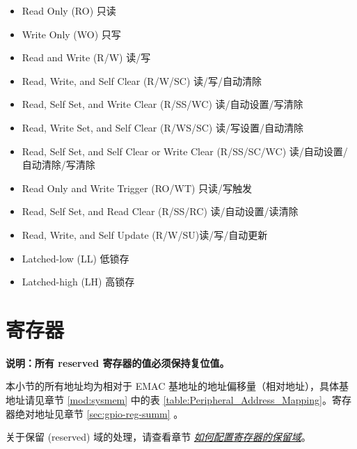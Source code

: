 \documentclass[main\_\_CN.tex]{subfiles}
\begin{document}
\begin{itemize}
    \item Read Only (RO) 只读
    \item Write Only (WO) 只写
    \item Read and Write (R/W) 读/写
    \item Read, Write, and Self Clear (R/W/SC) 读/写/自动清除
    \item Read, Self Set, and Write Clear (R/SS/WC) 读/自动设置/写清除
    \item Read, Write Set, and Self Clear (R/WS/SC) 读/写设置/自动清除
    \item Read, Self Set, and Self Clear or Write Clear (R/SS/SC/WC) 读/自动设置/自动清除/写清除
    \item Read Only and Write Trigger (RO/WT) 只读/写触发
    \item Read, Self Set, and Read Clear (R/SS/RC) 读/自动设置/读清除
    \item Read, Write, and Self Update (R/W/SU)读/写/自动更新
    \item Latched-low (LL) 低锁存
    \item Latched-high (LH) 高锁存
\end{itemize}



\section{寄存器}\label{ethernetreg}

\textbf{说明：所有 reserved 寄存器的值必须保持复位值。}

本小节的所有地址均为相对于 EMAC 基地址的地址偏移量（相对地址），具体基地址请见章节 \ref{mod:sysmem} \textit{} 中的表 \ref{table:Peripheral_Address_Mapping}。寄存器绝对地址见章节 \ref{sec:gpio-reg-summ} \textit{}。

关于保留 (reserved) 域的处理，请查看章节 \hyperref[programming-reserved-field]{\textit{如何配置寄存器的保留域}}。


\end{document}
